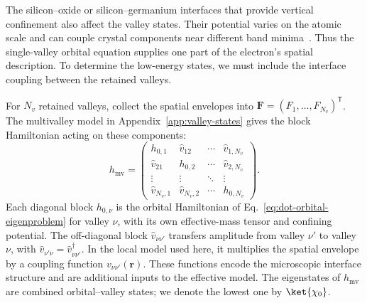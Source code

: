 The silicon--oxide or silicon--germanium interfaces that provide
vertical confinement also affect the valley states. Their potential
varies on the atomic scale and can couple crystal components near
different band minima~\cite{Friesen2010}. Thus the single-valley
orbital equation supplies one part of the electron's spatial
description. To determine the low-energy states, we must include
the interface coupling between the retained valleys.

For $N_v$ retained valleys, collect the spatial envelopes into
$\mathbf F=(F_1,\ldots,F_{N_v})^{\mathsf T}$.
The multivalley model in Appendix~\ref{app:valley-states} gives
the block Hamiltonian acting on these components:
\begin{equation}
 h_{\mathrm{mv}}=
 \begin{pmatrix}
  h_{0,1} & \hat v_{12} & \cdots & \hat v_{1,N_v}\\
  \hat v_{21} & h_{0,2} & \cdots & \hat v_{2,N_v}\\
  \vdots & \vdots & \ddots & \vdots\\
  \hat v_{N_v,1} & \hat v_{N_v,2} & \cdots & h_{0,N_v}
 \end{pmatrix}.
 \label{eq:dot-coupled-valley-equations}
\end{equation}
Each diagonal block $h_{0,\nu}$ is the orbital Hamiltonian
of Eq.~\eqref{eq:dot-orbital-eigenproblem} for valley $\nu$,
with its own effective-mass tensor and confining potential.
The off-diagonal block $\hat v_{\nu\nu'}$ transfers amplitude
from valley $\nu'$ to valley $\nu$, with
$\hat v_{\nu'\nu}=\hat v_{\nu\nu'}^\dagger$.
In the local model used here, it multiplies the spatial envelope
by a coupling function $v_{\nu\nu'}(\mathbf r)$. These functions
encode the microscopic interface structure and are additional
inputs to the effective model. The eigenstates of
$h_{\mathrm{mv}}$ are combined orbital--valley states; we denote
the lowest one by $\ket{\chi_0}$.

